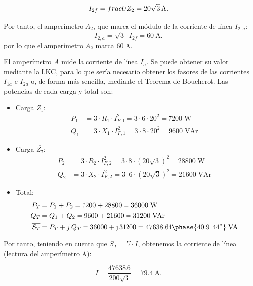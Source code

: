 \begin{equation*}
    I_{2f} = frac{U}{Z_2} = \qty[parse-numbers = false]{20\sqrt{3}}{\ampere}.
\end{equation*}

Por tanto, el amperímetro $A_2$, que marca el módulo de la corriente de línea $I_{2,a}$: 
\begin{equation*}
    I_{2,a}= \sqrt{3}\cdot I_{2f} = \qty{60}{\ampere}.
\end{equation*}
por lo que el amperímetro $A_2$ marca 60 A.

El amperímetro $A$ mide la corriente de línea $I_a$. Se puede obtener su valor mediante la LKC, para lo que sería necesario obtener los fasores de las corrientes $I_{1a}$ e $I_{2a}$ o, de forma más sencilla, mediante el Teorema de Boucherot. Las potencias de cada carga y total son:

\begin{itemize}
    \item Carga $\overline{Z_1}$:
    \begin{align*}
        P_1&=3\cdot R_1\cdot I_{F,1}^2=3\cdot 6\cdot 20^2=7200\;\text{W}\\
        Q_1&=3\cdot X_1\cdot I_{F,1}^2=3\cdot 8\cdot 20^2=9600\;\text{VAr}
    \end{align*}
    \item Carga $\overline{Z_2}$:
    \begin{align*}
        P_2&=3\cdot R_2\cdot I_{F,2}^2=3\cdot 8\cdot (20\sqrt{3})^2=28800\;\text{W}\\
        Q_2&=3\cdot X_2\cdot I_{F,2}^2=3\cdot 6\cdot (20\sqrt{3})^2=21600\;\text{VAr}
    \end{align*}
    \item Total:
    \begin{align*}
        P_T&=P_1+P_2=7200+28800=36000\;\text{W}\\
        Q_T&=Q_1+Q_2=9600+21600=31200\;\text{VAr}\\
        \overline{S_T}&=P_T+j\,Q_T={36000+\mathrm{j}\,31200 = 47638.64\phase{40.9144^\circ} \;\text{VA}}
    \end{align*}
\end{itemize}

Por tanto, teniendo en cuenta que $S_T = U \cdot I$, obtenemos la corriente de línea (lectura del amperímetro A):

\begin{equation*}
  I = \frac{47638.6}{200\sqrt{3}} = \qty{79.4}{\ampere}.
\end{equation*}


